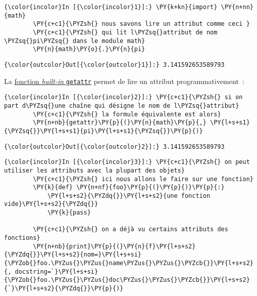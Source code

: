     \begin{Verbatim}[commandchars=\\\{\},frame=single,framerule=0.3mm,rulecolor=\color{cellframecolor}]
{\color{incolor}In [{\color{incolor}1}]:} \PY{k+kn}{import} \PY{n+nn}{math}
        \PY{c+c1}{\PYZsh{} nous savons lire un attribut comme ceci }
        \PY{c+c1}{\PYZsh{} qui lit l\PYZsq{}attribut de nom \PYZsq{}pi\PYZsq{} dans le module math}
        \PY{n}{math}\PY{o}{.}\PY{n}{pi}
\end{Verbatim}


\begin{Verbatim}[commandchars=\\\{\},frame=single,framerule=0.3mm,rulecolor=\color{cellframecolor}]
{\color{outcolor}Out[{\color{outcolor}1}]:} 3.141592653589793
\end{Verbatim}
            
    La
\href{https://docs.python.org/3/library/functions.html\#getattr}{fonction
\emph{built-in} \texttt{getattr}} permet de lire un attribut
programmativement~:

    \begin{Verbatim}[commandchars=\\\{\},frame=single,framerule=0.3mm,rulecolor=\color{cellframecolor}]
{\color{incolor}In [{\color{incolor}2}]:} \PY{c+c1}{\PYZsh{} si on part d\PYZsq{}une chaîne qui désigne le nom de l\PYZsq{}attribut}
        \PY{c+c1}{\PYZsh{} la formule équivalente est alors}
        \PY{n+nb}{getattr}\PY{p}{(}\PY{n}{math}\PY{p}{,} \PY{l+s+s1}{\PYZsq{}}\PY{l+s+s1}{pi}\PY{l+s+s1}{\PYZsq{}}\PY{p}{)}
\end{Verbatim}


\begin{Verbatim}[commandchars=\\\{\},frame=single,framerule=0.3mm,rulecolor=\color{cellframecolor}]
{\color{outcolor}Out[{\color{outcolor}2}]:} 3.141592653589793
\end{Verbatim}
            
    \begin{Verbatim}[commandchars=\\\{\},frame=single,framerule=0.3mm,rulecolor=\color{cellframecolor}]
{\color{incolor}In [{\color{incolor}3}]:} \PY{c+c1}{\PYZsh{} on peut utiliser les attributs avec la plupart des objets}
        \PY{c+c1}{\PYZsh{} ici nous allons le faire sur une fonction}
        \PY{k}{def} \PY{n+nf}{foo}\PY{p}{(}\PY{p}{)}\PY{p}{:} 
            \PY{l+s+s2}{\PYZdq{}}\PY{l+s+s2}{une fonction vide}\PY{l+s+s2}{\PYZdq{}}
            \PY{k}{pass}
        
        \PY{c+c1}{\PYZsh{} on a déjà vu certains attributs des fonctions}
        \PY{n+nb}{print}\PY{p}{(}\PY{n}{f}\PY{l+s+s2}{\PYZdq{}}\PY{l+s+s2}{nom=}\PY{l+s+si}{\PYZob{}foo.\PYZus{}\PYZus{}name\PYZus{}\PYZus{}\PYZcb{}}\PY{l+s+s2}{, docstring=`}\PY{l+s+si}{\PYZob{}foo.\PYZus{}\PYZus{}doc\PYZus{}\PYZus{}\PYZcb{}}\PY{l+s+s2}{`}\PY{l+s+s2}{\PYZdq{}}\PY{p}{)}
\end{Verbatim}


